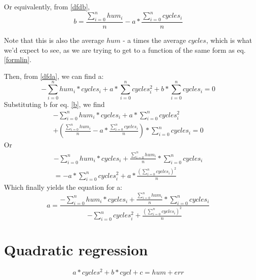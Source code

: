\documentclass{article}
\begin{document}
Or equivalently, from \ref{dfdb},
\begin{subequations}
	\begin{equation}
	\label{b}
		b = \frac{\sum_{i=0}^{n}{hum_{i}}}{n} - a * \frac{\sum_{i=0}^{n}{cycles_{i}}}{n} 
	\end{equation}
\end{subequations}

Note that this is also the average $hum$ - a times the average $cycles$, which is what we'd expect to see, as we are trying to get to a function of the same form as eq. \ref{formlin}.

Then, from \ref{dfda}, we can find a:
\begin{equation}
	-\sum_{i=0}^{n}{hum_{i}*cycles_{i}} + a*\sum_{i=0}^{n}{cycles_{i}^{2}} + b*\sum_{i=0}^{n}{cycles_{i}} = 0
\end{equation}
Substituting b for eq. \ref{b}, we find
\begin{equation}
	\begin{split}
		-\sum_{i=0}^{n}{hum_{i}*cycles_{i}} + a*\sum_{i=0}^{n}{cycles_{i}^{2}} \\ 
		+ \left( \frac{\sum_{i=0}^{n}{hum_{i}}}{n} - a * \frac{\sum_{i=0}^{n}{cycles_{i}}}{n}\right)*\sum_{i=0}^{n}{cycles_{i}} = 0
	\end{split}
\end{equation}
Or
\begin{equation}
	\begin{split}
		-\sum_{i=0}^{n}{hum_{i}*cycles_{i}}  + \frac{\sum_{i=0}^{n}{hum_{i}}}{n}*\sum_{i=0}^{n}{cycles_{i}} \\ 
		= - a*\sum_{i=0}^{n}{cycles_{i}^{2}} + a*\frac{(\sum_{i=0}^{n}{cycles_{i}})^{2} }{n}
	\end{split}
\end{equation}
Which finally yields the equation for a:
\begin{equation}
	a = \frac{	-\sum_{i=0}^{n}{hum_{i}*cycles_{i}}  + \frac{\sum_{i=0}^{n}{hum_{i}}}{n}*\sum_{i=0}^{n}{cycles_{i}}  }{-\sum_{i=0}^{n}{cycles_{i}^{2}}+\frac{(\sum_{i=0}^{n}{cycles_{i}})^{2} }{n} }
\end{equation}

\section{Quadratic regression}

\begin{equation}
	a*cycles^{2}+b*cycl+c=hum+err
\end{equation}
\end{document}

